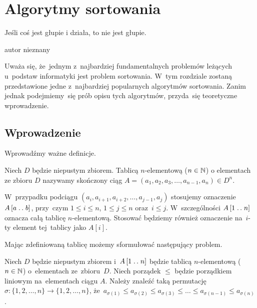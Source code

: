 \chapter{Algorytmy sortowania}

\epigraph{Jeśli coś jest głupie i działa, to nie jest głupie.}{autor nieznany}

Uważa się, że~jednym z~najbardziej fundamentalnych problemów 
leżących u~podstaw informatyki jest problem sortowania. W~tym rozdziale 
zostaną przedstawione jedne z~najbardziej popularnych algorytmów sortowania.
Zanim jednak podejmiemy~się prób opisu tych algorytmów, przyda~się teoretyczne wprowadzenie.

\section{Wprowadzenie}\label{sec:sorting:intro}

Wprowadźmy ważne definicje.

\begin{definition}[Tablica]\label{def:array}
    Niech \( D \) będzie niepustym zbiorem. Tablicą
    \( n \)-elementową (\( n \in \mathbb{N} \)) o elementach
    ze zbioru \( D \) nazywamy skończony ciąg
    \( A = (a_1, a_2, a_3, \dotsc, a_{n - 1}, a_n) \in D^n \).
\end{definition}
\begin{remark}
    W~przypadku podciągu \( (a_i, a_{i + 1}, a_{i + 2}, \dotsc, a_{j - 1}, a_j) \) 
    stosujemy oznaczenie \( A \left[ a \mathrel{{.}\,{.}}\nobreak b \right] \),
    przy~czym \( 1 \le i \le n \), \( 1 \le j \le n \) 
    oraz~\( i \le j \).
    W~szczególności \( A \left[ 1 \mathrel{{.}\,{.}}\nobreak n \right] \) 
    oznacza całą tablicę \( n \)-elementową.
    Stosować będziemy również oznaczenie na~\( i \)-ty 
    element tej~tablicy jako \(A \left[ i \right] \).
\end{remark}
Mając zdefiniowaną tablicę możemy sformułować następujący problem.
\begin{problem}\label{problem:sorting}
    Niech \( D \) będzie niepustym zbiorem 
    i~\( A \left[ 1 \mathrel{{.}\,{.}}\nobreak n \right] \) będzie 
    tablicą \( n \)-elementową (\( n \in \mathbb{N} \)) o~elementach
    ze~zbioru~\( D \).
    Niech porządek \( \le \) będzie porządkiem liniowym 
    na~elementach ciągu \( A \).
    Należy znaleźć taką permutację 
    \( \sigma : \{ 1, 2, \dotsc, n \} \to \{ 1, 2, \dotsc, n \} \), 
    że~\( a_{\sigma(1)} \le a_{\sigma(2)} \le a_{\sigma(3)} 
    \le \dotso \le a_{\sigma(n - 1)} \le a_{\sigma(n)} \).
\end{problem}
